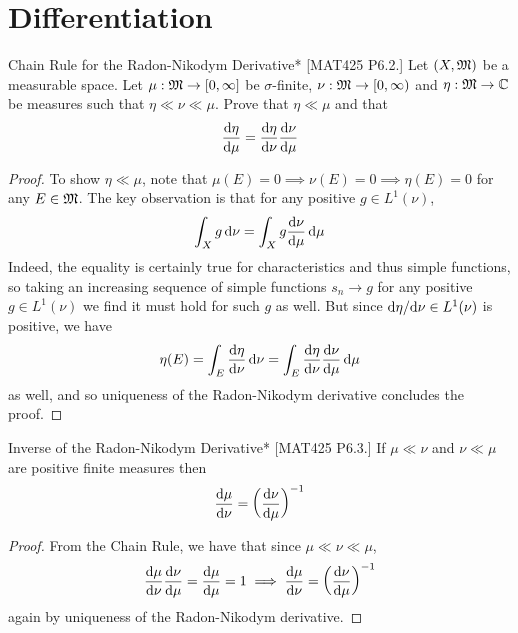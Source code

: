 \newpage
\section{Differentiation}

\begin{problem}{Chain Rule for the Radon-Nikodym Derivative}*
    [MAT425 P6.2.] Let \((X, \mathfrak{M})\) be a measurable space. Let \(\mu : \mathfrak{M} \to [0, \infty]\) be \(\sigma\)-finite, \(\nu : \mathfrak{M} \to [0, \infty)\) and \(\eta : \mathfrak{M} \to \mathbb{C}\) be measures such that \(\eta \ll \nu \ll \mu\). Prove that \(\eta \ll \mu\) and that 
    \[
        \frac{\mathrm{d}\eta}{\mathrm{d}\mu} = \frac{\mathrm{d}\eta}{\mathrm{d}\nu} \frac{\mathrm{d}\nu}{\mathrm{d}\mu}
    \]
\end{problem}

\begin{proof}
    To show \(\eta \ll \mu\), note that \(\mu(E) = 0 \implies \nu(E) = 0 \implies \eta(E) = 0\) for any \(E \in \mathfrak{M}\). The key observation is that for any positive \(g \in L^1(\nu)\), 
    \[
        \int_X g \, \mathrm{d}\nu = \int_X g \frac{\mathrm{d}\nu}{\mathrm{d}\mu} \, \mathrm{d}\mu
    \]
    Indeed, the equality is certainly true for characteristics and thus simple functions, so taking an increasing sequence of simple functions \(s_n \to g\) for any positive \(g \in L^1(\nu)\) we find it must hold for such \(g\) as well. But since \(\mathrm{d}\eta / \mathrm{d}\nu \in L^1(\nu)\) is positive, we have 
    \[
        \eta(E) = \int_E \frac{\mathrm{d}\eta}{\mathrm{d}\nu} \, \mathrm{d}\nu = \int_E \frac{\mathrm{d}\eta}{\mathrm{d}\nu} \frac{\mathrm{d}\nu}{\mathrm{d}\mu} \, \mathrm{d}\mu
    \]
    as well, and so uniqueness of the Radon-Nikodym derivative concludes the proof. 
\end{proof}

\begin{problem}{Inverse of the Radon-Nikodym Derivative}*
    [MAT425 P6.3.] If \(\mu \ll \nu\) and \(\nu \ll \mu\) are positive finite measures then 
    \[
        \frac{\mathrm{d}\mu}{\mathrm{d}\nu} = \left( \frac{\mathrm{d}\nu}{\mathrm{d}\mu} \right)^{-1}
    \]
\end{problem}

\begin{proof}
    From the Chain Rule, we have that since \(\mu \ll \nu \ll \mu\), 
    \[
        \frac{\mathrm{d}\mu}{\mathrm{d}\nu}\frac{\mathrm{d}\nu}{\mathrm{d}\mu} = \frac{\mathrm{d}\mu}{\mathrm{d}\mu} = 1
        \implies 
        \frac{\mathrm{d}\mu}{\mathrm{d}\nu} = \left( \frac{\mathrm{d}\nu}{\mathrm{d}\mu} \right)^{-1} 
    \]
    again by uniqueness of the Radon-Nikodym derivative. 
\end{proof}

